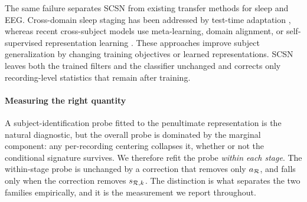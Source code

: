 The same failure separates SCSN from existing transfer methods for sleep and
EEG. Cross-domain sleep staging has been addressed by test-time adaptation
\citep{guo2025tta}, whereas recent cross-subject models use meta-learning,
domain alignment, or self-supervised representation learning
\citep{metasth2026,sedaeeg2025,transformeeg2026}. These approaches improve
subject generalization by changing training objectives or learned
representations. SCSN leaves both the trained filters and the classifier
unchanged and corrects only recording-level statistics that remain after
training.

\paragraph{Measuring the right quantity}
A subject-identification probe fitted to the penultimate representation is
the natural diagnostic, but the overall probe is dominated by the marginal
component: any per-recording centering collapses it, whether or not the
conditional signature survives. We therefore refit the probe \emph{within
each stage}. The within-stage probe is unchanged by a correction that removes
only $a_{\mathcal{R}}$, and falls only when the correction removes $s_{\mathcal{R},k}$. The
distinction is what separates the two families empirically, and it is the
measurement we report throughout.

